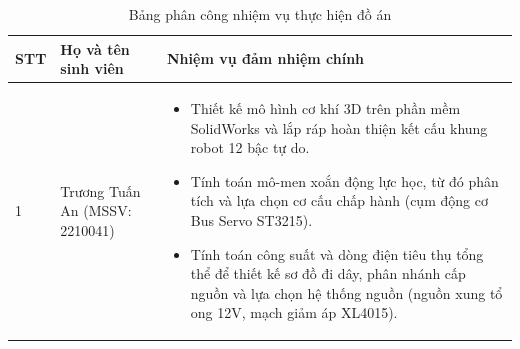 \begin{table}[H]
    \centering
    \caption{Bảng phân công nhiệm vụ thực hiện đồ án}
    \label{tab:phan_cong}
    \renewcommand{\arraystretch}{1.5}
    \begin{tabular}{|p{}|p{}|p{}|}
        \hline
        \textbf{STT} & \textbf{Họ và tên sinh viên} & \textbf{Nhiệm vụ đảm nhiệm chính} \\ \hline
        1 & Trương Tuấn An \newline (MSSV: 2210041) & 
        \vspace{-0.4cm}
        \begin{itemize}
            \item Thiết kế mô hình cơ khí 3D trên phần mềm SolidWorks và lắp ráp hoàn thiện kết cấu khung robot 12 bậc tự do.
            \item Tính toán mô-men xoắn động lực học, từ đó phân tích và lựa chọn cơ cấu chấp hành (cụm động cơ Bus Servo ST3215).
            \item Tính toán công suất và dòng điện tiêu thụ tổng thể để thiết kế sơ đồ đi dây, phân nhánh cấp nguồn và lựa chọn hệ thống nguồn (nguồn xung tổ ong 12V, mạch giảm áp XL4015).
        \end{itemize} \vspace{-0.4cm} \\ \hline
        

\end{tabular}
\end{table}
